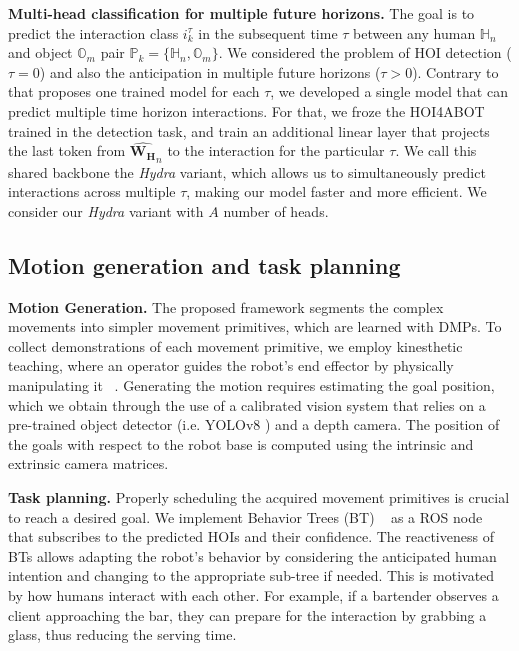 \documentclass{article}
\begin{document}
\textbf{Multi-head classification for multiple future horizons. }
The goal is to predict the interaction class $i_k^{\tau}$ in the subsequent time $\tau$ between any human $\mathbb{H}_n$ and object $\mathbb{O}_m$ pair $\mathbb{P}_k=\{ \mathbb{H}_n,\mathbb{O}_m \}$. We considered  the problem of HOI detection ($\tau=0$) and also the anticipation in multiple future horizons ($\tau>0$). Contrary to \cite{NI2023103741} that proposes one trained model for each $\tau$, we developed a single model that can predict multiple time horizon interactions. For that, we froze the HOI4ABOT trained in the detection task, and train an additional linear layer that projects the last token from $\widehat{\mathbf{W_H}}_{n}$ to the interaction for the particular $\tau$. We call this shared backbone the \textit{Hydra} variant, which allows us to simultaneously predict interactions across multiple $\tau$, making our model faster and more efficient. We consider our \textit{Hydra} variant with $A$ number of heads.

\subsection{Motion generation and task planning}
\textbf{Motion Generation.}
The proposed framework segments the complex movements into simpler movement primitives, which are learned with DMPs. To collect demonstrations of each movement primitive, we employ kinesthetic teaching, where an operator guides the robot's end effector by physically manipulating it ~\citep{KinestheticTeaching}. Generating the motion requires estimating the goal position, which we obtain through the use of a calibrated vision system that relies on a pre-trained object detector (i.e. YOLOv8 \citep{Jocher_YOLO_by_Ultralytics_2023}) and a depth camera. The position of the goals with respect to the robot base is computed using the intrinsic and extrinsic camera matrices.




\textbf{Task planning.}
Properly scheduling the acquired movement primitives is crucial to reach a desired goal. We implement Behavior Trees (BT) ~\citep{BehaviorTrees} as a ROS node that subscribes to the predicted HOIs and their confidence. The reactiveness of BTs allows adapting the robot's behavior by considering the anticipated human intention and changing to the appropriate sub-tree if needed. This is motivated by how humans interact with each other. For example, if a bartender observes a client approaching the bar, they can prepare for the interaction by grabbing a glass, thus reducing the serving time. 
\end{document}
